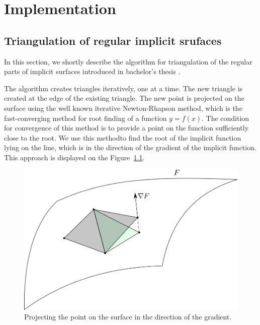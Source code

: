 \chapter{Implementation}
\label{chap3}

\section{Triangulation of regular implicit srufaces}
\label{triangulation-implicit}

In this section, we shortly describe the algorithm for triangulation of the regular
parts of implicit surfaces introduced in bachelor's thesis \cite{korecova2021triangulation}.

The algorithm creates triangles iteratively, one at a time. The new triangle is
created at the edge of the existing triangle. The new point is projected on the
surface using the well known iterative Newton-Rhapson method, which is the 
fast-converging method for root finding of a function $y=f(x)$. The condition 
for convergence of this method is to provide a point on the function sufficiently
close to the root. We use this methodto find the root of the implicit
function lying on the line, which is in the direction of the gradient of the implicit
function. This approach is displayed on the Figure~\ref{img:29}.
\begin{figure}
    \centerline{\includegraphics[scale=0.5]{images/img29}}
    \caption[Projecting the point on the surface]
    {Projecting the point on the surface in the direction of the gradient.}
    \label{img:29}
\end{figure}

